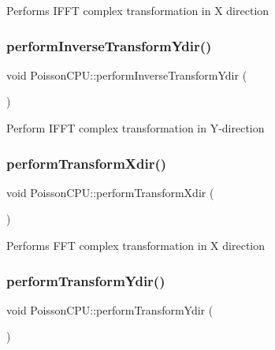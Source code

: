 Performs I\+F\+FT complex transformation in X direction \mbox{\label{classPoissonCPU_ae508a36c9a62af97bec476248e86ad0f}} 
\subsubsection{\texorpdfstring{perform\+Inverse\+Transform\+Ydir()}{performInverseTransformYdir()}}
{\footnotesize\ttfamily void Poisson\+C\+P\+U\+::perform\+Inverse\+Transform\+Ydir (\begin{DoxyParamCaption}{ }\end{DoxyParamCaption})}

Perform I\+F\+FT complex transformation in Y-\/direction \mbox{\label{classPoissonCPU_a63f9ffc159144ed2cf1f33052e87b132}} 
\subsubsection{\texorpdfstring{perform\+Transform\+Xdir()}{performTransformXdir()}}
{\footnotesize\ttfamily void Poisson\+C\+P\+U\+::perform\+Transform\+Xdir (\begin{DoxyParamCaption}{ }\end{DoxyParamCaption})}

Performs F\+FT complex transformation in X direction \mbox{\label{classPoissonCPU_a0e73fc27938db2321df283e4e515c184}} 
\subsubsection{\texorpdfstring{perform\+Transform\+Ydir()}{performTransformYdir()}}
{\footnotesize\ttfamily void Poisson\+C\+P\+U\+::perform\+Transform\+Ydir (\begin{DoxyParamCaption}{ }\end{DoxyParamCaption})}

